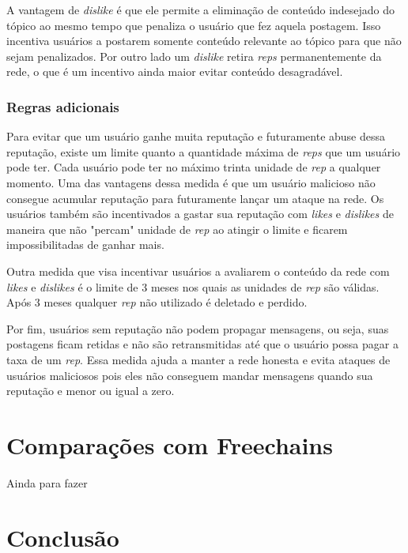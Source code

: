 \documentclass[12pt]{article}
\newcommand{\FC} {Freechains\xspace}
\begin{document}
A vantagem de \emph{dislike} é que ele permite a eliminação de conteúdo indesejado do tópico ao mesmo tempo que penaliza o usuário que fez aquela postagem. Isso incentiva usuários a postarem somente conteúdo relevante ao tópico para que não sejam penalizados. Por outro lado um \emph{dislike} retira \emph{reps} permanentemente da rede, o que é um incentivo ainda maior evitar conteúdo desagradável.

\subsubsection{Regras adicionais} \label{subsubsec:+regras}

Para evitar que um usuário ganhe muita reputação e futuramente abuse dessa reputação, existe um limite quanto a quantidade máxima de \emph{reps} que um usuário pode ter. Cada usuário pode ter no máximo trinta unidade de \emph{rep} a qualquer momento. Uma das vantagens dessa medida é que um usuário malicioso não consegue acumular reputação para futuramente lançar um ataque na rede. Os usuários também são incentivados a gastar sua reputação com \emph{likes} e \emph{dislikes} de maneira que não "percam" unidade de \emph{rep} ao atingir o limite e ficarem impossibilitadas de ganhar mais.

Outra medida que visa incentivar usuários a avaliarem o conteúdo da rede com \emph{likes} e \emph{dislikes} é o limite de 3 meses nos quais as unidades de \emph{rep} são válidas. Após 3 meses qualquer \emph{rep} não utilizado é deletado e perdido. 

Por fim, usuários sem reputação não podem propagar mensagens, ou seja, suas postagens ficam retidas e não são retransmitidas até que o usuário possa pagar a taxa de um \emph{rep}. Essa medida ajuda a manter a rede honesta e evita ataques de usuários maliciosos pois eles não conseguem mandar mensagens quando sua reputação e menor ou igual a zero.

\section{Comparações com \FC} \label{sec:comparacao}


Ainda para fazer

\section{Conclusão}\label{sec:conclusao}
\end{document}
